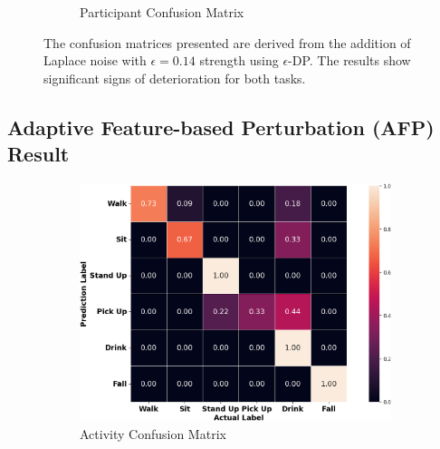 \documentclass{l4proj}
\begin{document}
\begin{appendices}
\begin{figure}[h]
\begin{subfigure}{0.45\textwidth}
        \caption{Participant Confusion Matrix}
        \label{fig:privacy-preservation-method1-participant-confusion-matrix}
    \end{subfigure}
    \caption{The confusion matrices presented are derived from the addition of Laplace noise with $\epsilon=0.14$ strength using $\epsilon$-DP. The results show significant signs of deterioration for both tasks.}
    \label{fig:privacy-preservation-method1-result-evaluation}
\end{figure}

\subsection{Adaptive Feature-based Perturbation (AFP) Result}
\begin{figure}[h]
    \centering
    \begin{subfigure}{0.49\textwidth}
        \includegraphics[width=\textwidth]{images/privacy-preservation-method2-activity-confusion-matrix.png}
        \caption{Activity Confusion Matrix}
        \label{fig:privacy-preservation-method2-activity-confusion-matrix}
    \end{subfigure}
    \qquad
    \begin{subfigure}{0.45\textwidth}

\end{subfigure}
\end{figure}
\end{appendices}
\end{document}
